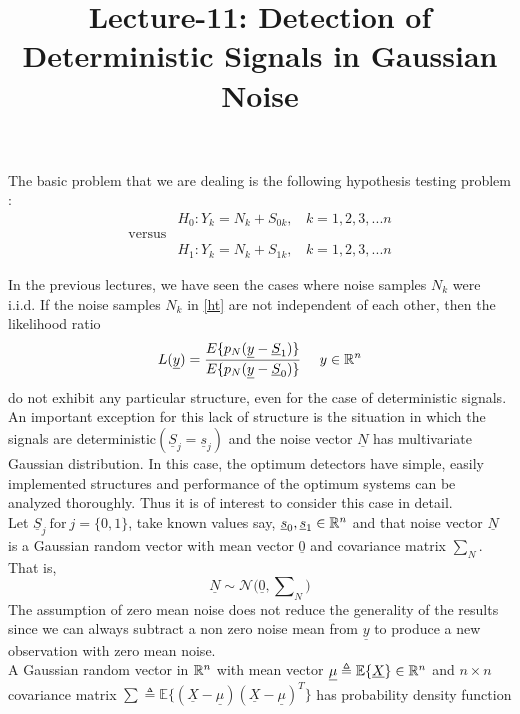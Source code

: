 \documentclass[a4paper,english,12pt]{article}
\title{Lecture-11: Detection of Deterministic Signals in Gaussian Noise}
\author{}
\begin{document}
\maketitle
\noindent The basic problem that we are dealing is the following hypothesis testing problem : 
\begin{equation}
\label{ht}
     \begin{aligned}
     & H_0 : Y_k=N_k+S_{0k} ,\ \ \ \ k=1,2,3,...n  \\
      \mbox{versus} & \\
       & H_1 : Y_k=N_k+S_{1k} ,\ \ \ \ k=1,2,3,...n
     \end{aligned}
\end{equation}


In the previous lectures, we have seen the cases where noise samples $N_k$ were i.i.d. If the noise samples $N_k$ in \eqref{ht} are not independent of each other, then the likelihood ratio 
\begin{equation}
L(\underline{y})=\frac{E \lbrace p_N(\underline{y}-\underline{S}_1)\rbrace}{E \lbrace p_N(\underline{y}-\underline{S}_0)\rbrace}  \ \ \  \ y\in \mathbb{R}^ n
\end{equation}
do not exhibit any particular structure, even for the case of deterministic signals.\\
An important exception for this lack of structure is the situation in which the signals are deterministic$(\underline{S}_j=\underline{s}_j)$ and the noise vector $\underline{N}$ has multivariate Gaussian distribution. In this case, the optimum detectors have simple, easily implemented structures and  performance of the optimum systems can be analyzed thoroughly. Thus it is of interest to consider this case in detail.\\
Let  $\underline{S}_j \ \mbox{for} \ j=\lbrace 0,1 \rbrace$, take known values say, $\underline{s}_0,\underline{s}_1 \in \mathbb{R} ^n$ and that noise vector $\underline{N}$ is a Gaussian random vector with mean vector $\underline{0}$ and covariance matrix $\sum_N$. That is,
\begin{equation}
\underline{N} \sim \mathcal{N} \Big(\underline{0}, \sum\nolimits_N \Big)
\end{equation}
The assumption of zero mean noise does not reduce the generality of the results since we can always subtract a non zero noise mean from $\underline{y}$ to produce a new observation with zero mean noise.\\
A Gaussian random vector in $\mathbb{R}^n$ with mean vector  $\underline{\mu} \triangleq \mathbb{E}\lbrace\underline{X} \rbrace \in \mathbb{R}^n$ and $n \times n $ covariance matrix $\sum \triangleq \mathbb{E} \lbrace (\underline{X}-\underline{\mu})(\underline{X}-\underline{\mu})^T \rbrace$ has probability density function 
\end{document}
